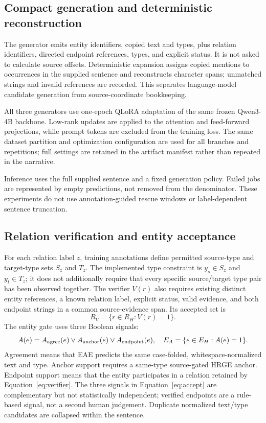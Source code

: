 \documentclass[preprint,12pt]{elsarticle}
\begin{document}
\subsection{Compact generation and deterministic reconstruction}
The generator emits entity identifiers, copied text and types, plus relation
identifiers, directed endpoint references, types, and explicit status. It is
not asked to calculate source offsets. Deterministic expansion assigns copied
mentions to occurrences in the supplied sentence and reconstructs character
spans; unmatched strings and invalid references are recorded. This separates
language-model candidate generation from source-coordinate bookkeeping.

All three generators use one-epoch QLoRA adaptation of the same frozen
Qwen3-4B backbone. Low-rank updates are applied to the attention and
feed-forward projections, while prompt tokens are excluded from the training
loss. The same dataset partition and optimization configuration are used for
all branches and repetitions; full settings are retained in the artifact
manifest rather than repeated in the narrative.

Inference uses the full supplied sentence and a fixed generation policy.
Failed jobs are represented by empty predictions, not removed from the
denominator. These experiments do not use
annotation-guided rescue windows or label-dependent sentence truncation.

\subsection{Relation verification and entity acceptance}
For each relation label $z$, training annotations define permitted source-type
and target-type sets $S_z$ and $T_z$. The implemented type constraint is
$y_s\in S_z$ and $y_t\in T_z$; it does not additionally require that every
specific source/target type pair has been observed together. The verifier
$V(r)$ also requires existing distinct entity references, a known relation
label, explicit status, valid evidence, and both endpoint strings in a common
source-evidence span. Its accepted set is
\begin{equation}
R_V=\{r\in R_H:V(r)=1\}.
\label{eq:verifier}
\end{equation}
The entity gate uses three Boolean signals:
\begin{equation}
A(e)=A_{\rm agree}(e)\lor A_{\rm anchor}(e)\lor A_{\rm endpoint}(e),
\quad E_A=\{e\in E_H:A(e)=1\}.
\label{eq:accept}
\end{equation}
Agreement means that EAE predicts the same case-folded, whitespace-normalized
text and type. Anchor support requires a same-type source-gated HRGE anchor.
Endpoint support means that the entity participates in a relation retained by
Equation~\eqref{eq:verifier}. The three signals in Equation~\eqref{eq:accept}
are complementary but not statistically independent; verified endpoints are
a rule-based signal, not a second human judgement. Duplicate normalized
text/type candidates are collapsed within the sentence.
\end{document}
